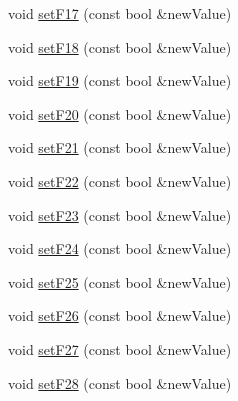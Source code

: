 \begin{DoxyCompactItemize}
\item 
void \hyperlink{classIoTT_1_1LocDecoder_a8e10e113460d9c377234cd1be678931a}{set\+F17} (const bool \&new\+Value)
\item 
void \hyperlink{classIoTT_1_1LocDecoder_aeb2fef072ba2340f98b72b6a4d65af6a}{set\+F18} (const bool \&new\+Value)
\item 
void \hyperlink{classIoTT_1_1LocDecoder_a5b39b25fbce7cb68a89862e34d0829ee}{set\+F19} (const bool \&new\+Value)
\item 
void \hyperlink{classIoTT_1_1LocDecoder_a4014c83224b461c36f190c40a86e8444}{set\+F20} (const bool \&new\+Value)
\item 
void \hyperlink{classIoTT_1_1LocDecoder_a35458b4c739bfeceb9823a82e06cbf7d}{set\+F21} (const bool \&new\+Value)
\item 
void \hyperlink{classIoTT_1_1LocDecoder_a0d378a7a02012c3c3e139ff554b78c6f}{set\+F22} (const bool \&new\+Value)
\item 
void \hyperlink{classIoTT_1_1LocDecoder_a49c5c584123beba94068591eb8744d7d}{set\+F23} (const bool \&new\+Value)
\item 
void \hyperlink{classIoTT_1_1LocDecoder_a89b14ddd70af0d3c72a3a077cd32df4c}{set\+F24} (const bool \&new\+Value)
\item 
void \hyperlink{classIoTT_1_1LocDecoder_ac767e22e04d636a034e71faa72854afa}{set\+F25} (const bool \&new\+Value)
\item 
void \hyperlink{classIoTT_1_1LocDecoder_ab46b1404908d6362cdd1660a871b92a1}{set\+F26} (const bool \&new\+Value)
\item 
void \hyperlink{classIoTT_1_1LocDecoder_ac3293265ed2d36d721e637e0a4f8f1ae}{set\+F27} (const bool \&new\+Value)
\item 
void \hyperlink{classIoTT_1_1LocDecoder_a082ff7e341958add6a0367c989c58d0a}{set\+F28} (const bool \&new\+Value)
\end{DoxyCompactItemize}
